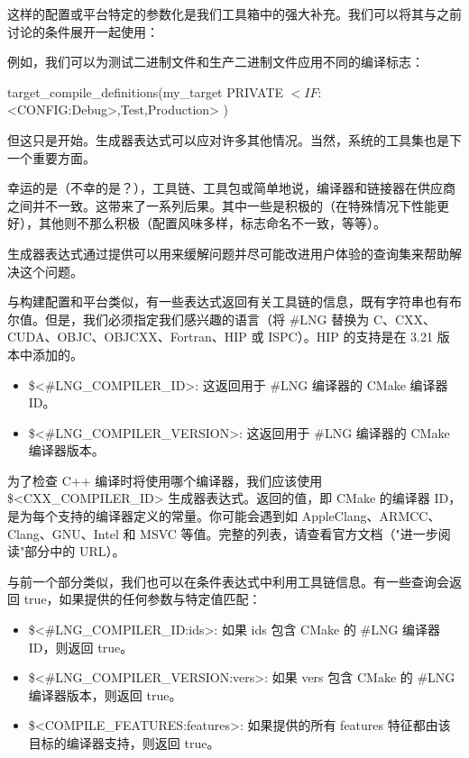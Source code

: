 这样的配置或平台特定的参数化是我们工具箱中的强大补充。我们可以将其与之前讨论的条件展开一起使用：


例如，我们可以为测试二进制文件和生产二进制文件应用不同的编译标志：

\begin{cmake}
target_compile_definitions(my_target PRIVATE
    $<IF:$<CONFIG:Debug>,Test,Production>
)
\end{cmake}

但这只是开始。生成器表达式可以应对许多其他情况。当然，系统的工具集也是下一个重要方面。


幸运的是（不幸的是？），工具链、工具包或简单地说，编译器和链接器在供应商之间并不一致。这带来了一系列后果。其中一些是积极的（在特殊情况下性能更好），其他则不那么积极（配置风味多样，标志命名不一致，等等）。

生成器表达式通过提供可以用来缓解问题并尽可能改进用户体验的查询集来帮助解决这个问题。

与构建配置和平台类似，有一些表达式返回有关工具链的信息，既有字符串也有布尔值。但是，我们必须指定我们感兴趣的语言（将 \#LNG 替换为 C、CXX、CUDA、OBJC、OBJCXX、Fortran、HIP 或 ISPC）。HIP 的支持是在 3.21 版本中添加的。

\begin{itemize}
\item
\$<\#LNG\_COMPILER\_ID>: 这返回用于 \#LNG 编译器的 CMake 编译器 ID。

\item
\$<\#LNG\_COMPILER\_VERSION>: 这返回用于 \#LNG 编译器的 CMake 编译器版本。
\end{itemize}

为了检查 C++ 编译时将使用哪个编译器，我们应该使用 \$<CXX\_COMPILER\_ID> 生成器表达式。返回的值，即 CMake 的编译器 ID，是为每个支持的编译器定义的常量。你可能会遇到如 AppleClang、ARMCC、Clang、GNU、Intel 和 MSVC 等值。完整的列表，请查看官方文档（"进一步阅读"部分中的 URL）。

与前一个部分类似，我们也可以在条件表达式中利用工具链信息。有一些查询会返回 true，如果提供的任何参数与特定值匹配：

\begin{itemize}
\item
\$<\#LNG\_COMPILER\_ID:ids>: 如果 ids 包含 CMake 的 \#LNG 编译器 ID，则返回 true。

\item
\$<\#LNG\_COMPILER\_VERSION:vers>: 如果 vers 包含 CMake 的 \#LNG 编译器版本，则返回 true。

\item
\$<COMPILE\_FEATURES:features>: 如果提供的所有 features 特征都由该目标的编译器支持，则返回 true。
\end{itemize}

